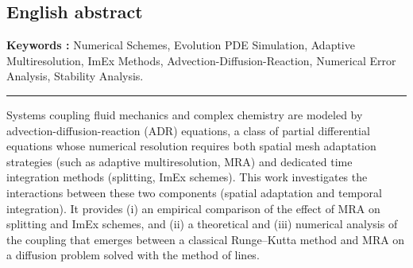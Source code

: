 \subsection*{English abstract}
    \textbf{Keywords  :} Numerical Schemes, Evolution PDE Simulation, Adaptive Multiresolution, ImEx Methods,
    Advection-Diffusion-Reaction, Numerical Error Analysis, Stability Analysis.\par
    \noindent\rule{\textwidth}{0.4pt}
    Systems coupling fluid mechanics and complex chemistry are modeled by advection-diffusion-reaction (ADR) equations, 
    a class of partial differential equations whose numerical resolution requires both spatial mesh adaptation strategies 
    (such as adaptive multiresolution, MRA) and dedicated time integration methods (splitting, ImEx schemes).
    This work investigates the interactions between these two components (spatial adaptation and temporal integration).
    It provides (i) an empirical comparison of the effect of MRA on splitting and ImEx schemes, 
    and (ii) a theoretical and (iii) numerical analysis of the coupling that emerges between a classical Runge–Kutta method and MRA on a diffusion problem solved with the method of lines.
\newpage